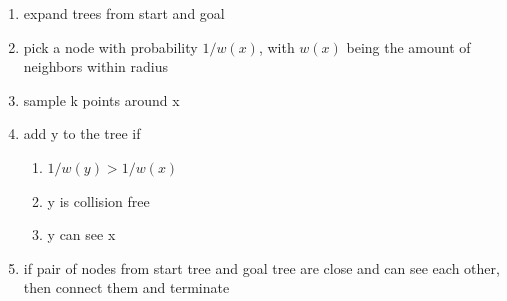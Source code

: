 \begin{multicols*}{2}
\begin{enumerate}
	\item expand trees from start and goal
	\item pick a node with probability $1/w(x)$, with $w(x)$ being the amount of neighbors within radius
	\item sample k points around x
	\item add y to the tree if
	\begin{enumerate}
		\item $1/w(y) > 1/w(x)$
		\item y is collision free
		\item y can see x
	\end{enumerate}
	\item if pair of nodes from start tree and goal tree are close and can see each other, then connect them and terminate
\end{enumerate}


\end{multicols*}
